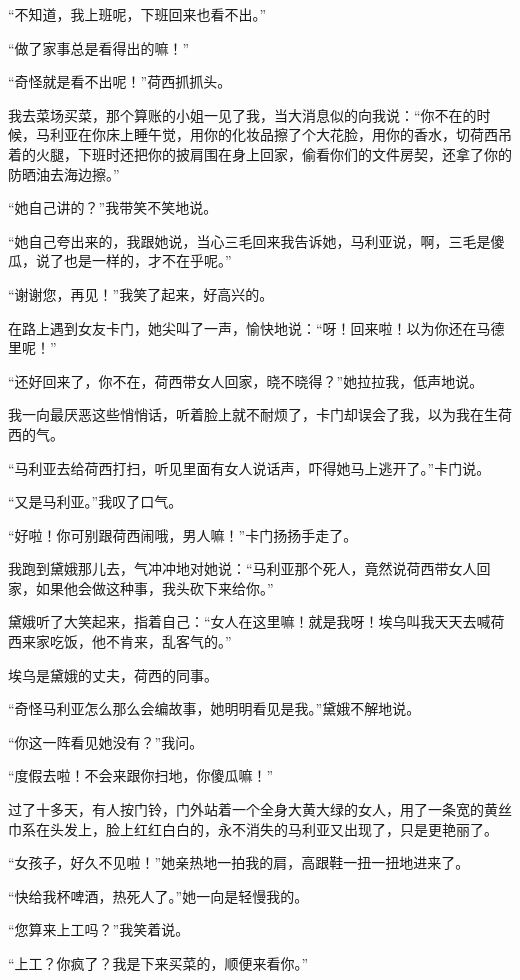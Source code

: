\par “不知道，我上班呢，下班回来也看不出。”
\par “做了家事总是看得出的嘛！”
\par “奇怪就是看不出呢！”荷西抓抓头。
\par 我去菜场买菜，那个算账的小姐一见了我，当大消息似的向我说：“你不在的时候，马利亚在你床上睡午觉，用你的化妆品擦了个大花脸，用你的香水，切荷西吊着的火腿，下班时还把你的披肩围在身上回家，偷看你们的文件房契，还拿了你的防晒油去海边擦。”
\par “她自己讲的？”我带笑不笑地说。
\par “她自己夸出来的，我跟她说，当心三毛回来我告诉她，马利亚说，啊，三毛是傻瓜，说了也是一样的，才不在乎呢。”
\par “谢谢您，再见！”我笑了起来，好高兴的。
\par 在路上遇到女友卡门，她尖叫了一声，愉快地说：“呀！回来啦！以为你还在马德里呢！”
\par “还好回来了，你不在，荷西带女人回家，晓不晓得？”她拉拉我，低声地说。
\par 我一向最厌恶这些悄悄话，听着脸上就不耐烦了，卡门却误会了我，以为我在生荷西的气。
\par “马利亚去给荷西打扫，听见里面有女人说话声，吓得她马上逃开了。”卡门说。
\par “又是马利亚。”我叹了口气。
\par “好啦！你可别跟荷西闹哦，男人嘛！”卡门扬扬手走了。
\par 我跑到黛娥那儿去，气冲冲地对她说：“马利亚那个死人，竟然说荷西带女人回家，如果他会做这种事，我头砍下来给你。”
\par 黛娥听了大笑起来，指着自己：“女人在这里嘛！就是我呀！埃乌叫我天天去喊荷西来家吃饭，他不肯来，乱客气的。”
\par 埃乌是黛娥的丈夫，荷西的同事。
\par “奇怪马利亚怎么那么会编故事，她明明看见是我。”黛娥不解地说。
\par “你这一阵看见她没有？”我问。
\par “度假去啦！不会来跟你扫地，你傻瓜嘛！”
\par 过了十多天，有人按门铃，门外站着一个全身大黄大绿的女人，用了一条宽的黄丝巾系在头发上，脸上红红白白的，永不消失的马利亚又出现了，只是更艳丽了。
\par “女孩子，好久不见啦！”她亲热地一拍我的肩，高跟鞋一扭一扭地进来了。
\par “快给我杯啤酒，热死人了。”她一向是轻慢我的。
\par “您算来上工吗？”我笑着说。
\par “上工？你疯了？我是下来买菜的，顺便来看你。”
